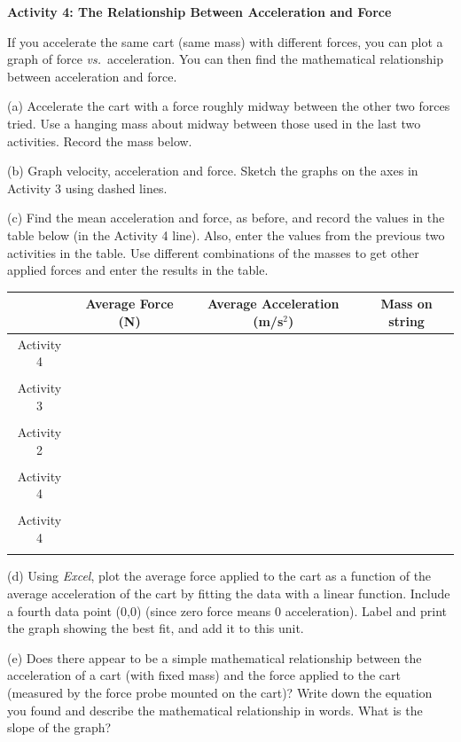\pagebreak[2]
\textbf{Activity 4: The Relationship Between Acceleration and Force }

If you accelerate the same cart (same mass) with different forces, you can 
plot a graph of force \textit{vs.}~acceleration.
You can then find the mathematical relationship between acceleration and force. 

(a) Accelerate the cart with a force roughly midway between the other two forces
tried. Use a hanging mass about midway between those used in the last two activities.
Record the mass below.
\answerspace{10mm}

(b) Graph velocity, acceleration and force. Sketch the graphs on the axes in
Activity 3 using dashed lines.

(c) Find the mean acceleration and force, as before, and record the values in
the table below (in the Activity 4 line). Also, enter the values from the previous 
two activities in the table.
Use different combinations of the
masses to get other applied forces and enter the results in the table. 

\vspace{0.3cm}
{\centering \begin{tabular}{|c|c|c|c|}
\hline 
&
Average Force (N)&
Average Acceleration (m/s\( ^{2} \)) &
Mass on string\\
\hline 
Activity 4&
&
&
\\
&
&
&
\\
\hline 
Activity 3&
&
&
\\
&
&
&
\\
\hline 
Activity 2&
&
&
\\
&
&
&
\\
\hline 
Activity 4&
&
&
\\
&
&
&
\\
\hline 
Activity 4&
&
&
\\
&
&
&
\\
\hline 
\end{tabular}\par}
\vspace{0.3cm}

(d) Using \textit{Excel}, plot the average force applied to the cart as a function of the average acceleration of the cart by fitting the data with a linear function. Include a fourth data point (0,0) (since zero force means 0 acceleration). Label and print the graph showing the best fit, and add it to this unit.

(e) Does there appear to be a simple mathematical relationship between the acceleration of a cart (with fixed mass) and the force applied to the cart (measured by the force probe mounted on the cart)? Write down the equation you found and describe the mathematical relationship in words.  What is the slope of the graph?
\answerspace{20mm}


